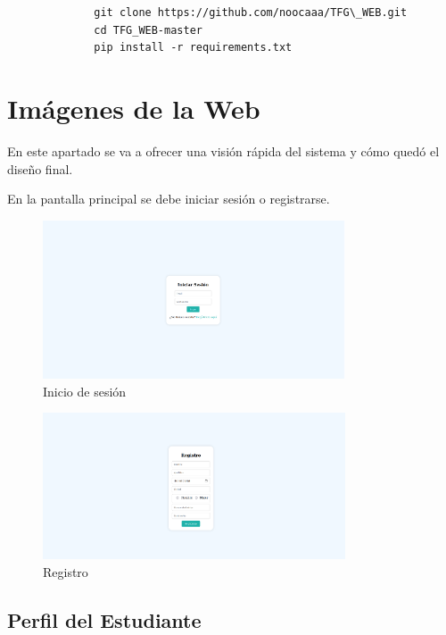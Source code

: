 \begin{appendices}
\begin{figure}[H]
    \centering
    \begin{lstlisting}
        git clone https://github.com/noocaaa/TFG\_WEB.git
        cd TFG_WEB-master
        pip install -r requirements.txt
    \end{lstlisting}
\end{figure}

\section {Imágenes de la Web}

En este apartado se va a ofrecer una visión rápida del sistema y cómo quedó el diseño final. 

En la pantalla principal se debe iniciar sesión o registrarse. 

\begin{figure}[H]
    \centering
    \includegraphics[width=0.8\textwidth]{imagenes/Manual/inicio.png}
    \caption{Inicio de sesión}
\end{figure}

\begin{figure}[H]
    \centering
    \includegraphics[width=0.8\textwidth]{imagenes/Manual/registro.png}
    \caption{Registro}
\end{figure}

\subsection {Perfil del Estudiante}


\end{appendices}
